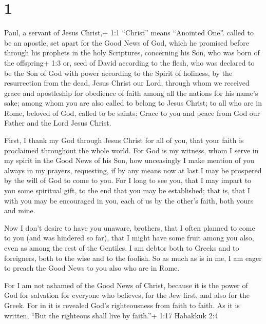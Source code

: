 \hypertarget{section}{%
\section{1}\label{section}}

 Paul, a servant of Jesus Christ,+ 1:1 ``Christ'' means
``Anointed One''. called to be an apostle, set apart for the Good News
of God,  which he promised before through his prophets in
the holy Scriptures,  concerning his Son, who was born of
the offspring+ 1:3 or, seed of David according to the flesh,
 who was declared to be the Son of God with power according
to the Spirit of holiness, by the resurrection from the dead, Jesus
Christ our Lord,  through whom we received grace and
apostleship for obedience of faith among all the nations for his name's
sake;  among whom you are also called to belong to Jesus
Christ;  to all who are in Rome, beloved of God, called to
be saints: Grace to you and peace from God our Father and the Lord Jesus
Christ.

 First, I thank my God through Jesus Christ for all of you,
that your faith is proclaimed throughout the whole world. 
For God is my witness, whom I serve in my spirit in the Good News of his
Son, how unceasingly I make mention of you always in my prayers,
 requesting, if by any means now at last I may be prospered
by the will of God to come to you.  For I long to see you,
that I may impart to you some spiritual gift, to the end that you may be
established;  that is, that I with you may be encouraged in
you, each of us by the other's faith, both yours and mine.

 Now I don't desire to have you unaware, brothers, that I
often planned to come to you (and was hindered so far), that I might
have some fruit among you also, even as among the rest of the Gentiles.
 I am debtor both to Greeks and to foreigners, both to the
wise and to the foolish.  So as much as is in me, I am
eager to preach the Good News to you also who are in Rome.

 For I am not ashamed of the Good News of Christ, because
it is the power of God for salvation for everyone who believes, for the
Jew first, and also for the Greek.  For in it is revealed
God's righteousness from faith to faith. As it is written, ``But the
righteous shall live by faith.''+ 1:17 Habakkuk 2:4

